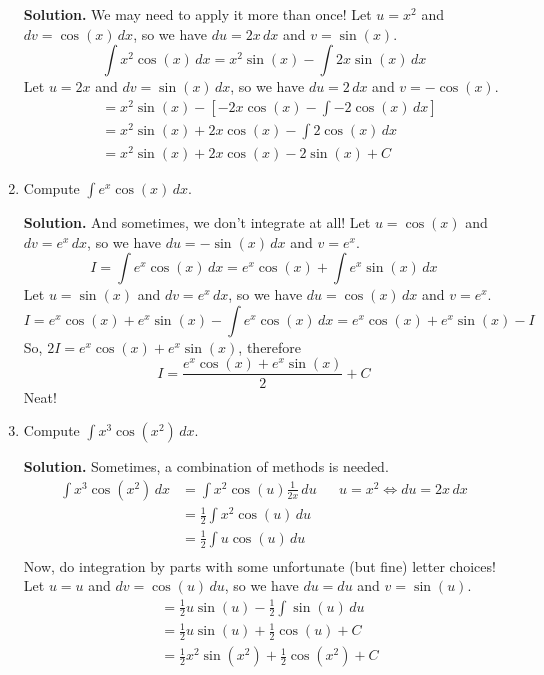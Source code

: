 \begin{Example}{}{}
\begin{enumerate}[label=(\roman*)]
              \textbf{Solution.} We may need to apply it more than once! Let $ u=x^2 $ and $ dv=\cos(x)\,dx $,
              so we have $ du=2x\,dx $ and $ v=\sin(x) $.
              \[
                  \int x^2\cos(x)\, d{x}
                  =x^2\sin(x)-\int 2x\sin(x)\, d{x}
              \]
              Let $ u=2x $ and $ dv=\sin(x)\,dx $, so we have $ du=2\,dx $ and $ v=-\cos(x) $.
              \begin{align*}
                   & =x^2\sin(x)-\left[-2x\cos(x)-\int -2\cos(x)\, d{x} \right] \\
                   & =x^2\sin(x)+2x\cos(x)-\int 2\cos(x)\, d{x}                 \\
                   & =x^2\sin(x)+2x\cos(x)-2\sin(x)+C
              \end{align*}
        \item Compute $ \displaystyle \int e^x\cos(x)\, d{x} $.

              \textbf{Solution.} And sometimes, we don't integrate at all! Let $ u=\cos(x) $
              and $ dv=e^x\,dx $, so we have $ du=-\sin(x)\,dx $ and $ v=e^x $.
              \[
                  I =\int e^x\cos(x)\, d{x}
                  =e^x\cos(x)+\int e^x\sin(x)\, d{x}
              \]
              Let $ u=\sin(x) $ and $ dv=e^x\,dx $, so we have $ du=\cos(x)\,dx $ and $ v=e^x $.
              \[
                  I=e^x\cos(x)+e^x\sin(x)-\int e^x\cos(x)\, d{x}
                  =e^x\cos(x)+e^x\sin(x)-I
              \]
              So, $ 2I=e^x\cos(x)+e^x\sin(x) $, therefore
              \[ I=\frac{e^x\cos(x)+e^x\sin(x)}{2} +C \]
              Neat!
        \item Compute $ \displaystyle \int x^3\cos(x^2)\, d{x} $.

              \textbf{Solution.} Sometimes, a combination of methods is needed.
              \begin{align*}
                  \int x^3\cos(x^2)\, d{x}
                   & =\int x^2\cos(u)\frac{1}{2x} \, d{u} &  & u=x^2\iff du=2x\,dx \\
                   & =\frac{1}{2} \int x^2\cos(u)\, d{u}                           \\
                   & =\frac{1}{2} \int u\cos(u)\, d{u}                             \\
              \end{align*}
              Now, do integration by parts with some unfortunate (but fine) letter
              choices! Let $ u=u $ and $ dv=\cos(u)\,du $, so we have $ du=du $
              and $ v=\sin(u) $.
              \begin{align*}
                   & =\frac{1}{2} u\sin(u)-\frac{1}{2} \int \sin(u)\, d{u} \\
                   & =\frac{1}{2} u\sin(u)+\frac{1}{2} \cos(u)+C           \\
                   & =\frac{1}{2} x^2\sin(x^2)+\frac{1}{2} \cos(x^2)+C
              \end{align*}
    \end{enumerate}
\end{Example}

